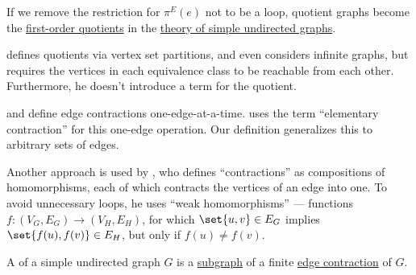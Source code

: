 \begin{comments}
  \item If we remove the restriction for \( \pi^E(e) \) not to be a loop, quotient graphs become the \hyperref[def:first_order_quotient]{first-order quotients} in the \hyperref[rem:theory_of_simple_undirected_graphs]{theory of simple undirected graphs}.

  \item {} defines quotients via vertex set partitions, and even considers infinite graphs, but requires the vertices in each equivalence class to be reachable from each other. Furthermore, he doesn't introduce a term for the quotient.

  \item {} and  define edge contractions one-edge-at-a-time.  uses the term \enquote{elementary contraction} for this one-edge operation. Our definition generalizes this to arbitrary sets of edges.

  \item Another approach is used by , who defines \enquote{contractions} as compositions of homomorphisms, each of which contracts the vertices of an edge into one. To avoid unnecessary loops, he uses \enquote{weak homomorphisms} --- functions \( f: (V_G, E_G) \to (V_H, E_H) \), for which \( \set{ u, v } \in E_G \) implies \( \set{ f(u), f(v) } \in E_H \), but only if \( f(u) \neq f(v) \).
\end{comments}

\begin{definition}\label{def:graph_minor}
  A  of a simple undirected graph \( G \) is a \hyperref[def:undirected_graph/subgraph]{subgraph} of a finite \hyperref[def:quotient_graph/edge]{edge contraction} of \( G \).
\end{definition}
